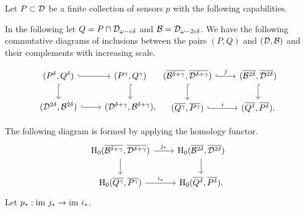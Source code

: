 Let $P\subset {\mathcal{D}}$ be a finite collection of sensors $p$ with the following capabilities.

\vspace{3ex}
\begin{center}
\setlength{\fboxsep}{2ex}
\end{center}\vspace{3ex}

In the following let $Q = P\cap {\mathcal{D}}_{\omega - c\delta}$ and ${\mathcal{B}} = {\mathcal{D}}_{\omega-2c\delta}$.
We have the following commutative diagrams of inclusions between the pairs $(P,Q)$ and $({\mathcal{D}}, {\mathcal{B}})$ and their complements with increasing scale.

\[ \begin{tikzcd}
(P^\delta, Q^\delta) \arrow[hookrightarrow]{r}\arrow[hookrightarrow]{d}& (P^\gamma, Q^\gamma) \arrow[hookrightarrow]{d} \\%
(\D^{2\delta}, \B^{2\delta}) \arrow[hookrightarrow]{r} & (\D^{\delta+\gamma}, \B^{\delta+\gamma}),
\end{tikzcd}
\begin{tikzcd}
(\overline{\B^{\delta+\gamma}}, \overline{\D^{\delta+\gamma}})\arrow[hookrightarrow]{r}{j}\arrow[hookrightarrow]{d}& (\overline{\B^{2\delta}}, \overline{\D^{2\delta}}) \arrow[hookrightarrow]{d} \\%
(\overline{Q^\gamma}, \overline{P^\gamma}) \arrow[hookrightarrow]{r}{i} & (\overline{Q^\delta}, \overline{P^\delta}).
\end{tikzcd}\]

The following diagram is formed by applying the homology functor.
\begin{equation}\label{dgm:1}
    \begin{tikzcd}
    \hom_0(\overline{\B^{\delta+\gamma}}, \overline{\D^{\delta+\gamma}})\arrow{r}{j_*}\arrow{d}& \hom_0(\overline{\B^{2\delta}}, \overline{\D^{2\delta}}) \arrow{d} \\%
    \hom_0(\overline{Q^\gamma}, \overline{P^\gamma}) \arrow{r}{i_*} & \hom_0(\overline{Q^\delta}, \overline{P^\delta}).
    \end{tikzcd}
\end{equation}
Let $p_* : \mathrm{im}~j_*\to\mathrm{im}~i_*$.

